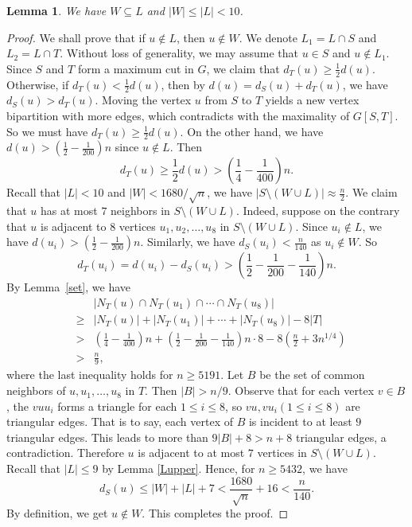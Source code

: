 \documentclass[11pt]{article}
\newtheorem{lemma}[theorem]{Lemma}
\begin{document}
  
  \begin{lemma} \label{lem-W-sub-L}
  We have $W \subseteq L$ and $|W| \le |L| < 10$. 
  \end{lemma}
  
  \begin{proof}
We shall prove that if $u\notin L$, then $u\notin W$. 
We denote $L_1=L\cap S$ and $L_2=L\cap T$. Without loss of generality, we may assume that $u\in S$ and 
   $u\notin L_1.$ Since  $S$ and $T$ form a maximum cut in $G$, 
   we claim that $d_T(u)\ge \frac{1}{2}d(u)$. 
   Otherwise, if $d_T(u)< \frac{1}{2}d(u)$, then 
   by $d(u)=d_S(u) + d_T(u)$, we have 
   $d_S(u) > d_T(u)$. Moving the vertex $u$ from 
   $S$ to $T$ yields a new vertex bipartition with more edges, 
   which contradicts with the maximality of $G[S,T]$. 
   So we must have $d_T(u)\ge \frac{1}{2}d(u)$. 
  On the other hand, 
  we have $d(u)> \left(\frac{1}{2}-\frac{1}{200} \right)n$ 
  since $u\not\in L$. Then 
   $$d_T(u)\ge \frac{1}{2}d(u)> 
   \left(\frac{1}{4}-\frac{1}{400} \right)n.$$
  Recall that 
  $|L|< 10$ and $|W| < 1680/ \sqrt{n}$, 
we have 
$  |S\setminus (W\cup L)| \approx \frac{n}{2}$. 
  We claim that $u$ has at most $7$ neighbors in 
  $S\setminus (W\cup L)$. 
  Indeed, suppose on the contrary that 
   $u$ is adjacent to $8$ vertices  $u_1, u_2,\ldots, u_8$ in $S\setminus (W\cup L)$.  Since $u_i\not\in L$,  we have $d(u_i)> \left(\frac{1}{2}-\frac{1}{200}\right )n$. Similarly, 
   we have $d_S(u_i)< \frac{n}{140}$ as $u_i\notin W$. So
  \[  d_T(u_i)=d(u_i)-d_S(u_i)> \left(\frac{1}{2}-\frac{1}{200} - \frac{1}{140} \right)n. \] 
   By Lemma~\ref{set}, we have
   \begin{eqnarray*}
&& \left|N_T(u)\cap N_T(u_1) \cap \cdots 
\cap N_T(u_8) \right|\\[2mm]
 &\ge&  |N_T(u)|+ |N_T(u_1)| + \cdots + |N_T(u_8)|  -8|T| \\
& > &\left (\frac{1}{4}-\frac{1}{400}\right)n+\left(\frac{1}{2}-\frac{1}{200} -\frac{1}{140} \right)n\cdot 8 - 8 \left( \frac{n}{2} + 3n^{1/4}\right)\\
 &>&\frac{n}{9}, 
\end{eqnarray*}
 where the last inequality holds for $n\ge 5191$.  
Let $B$ be the set of common neighbors of $u,u_1,\ldots ,u_8$ in $T$. 
Then $|B|>n/9$. 
Observe that for each vertex $v\in B$, the $vuu_i$ forms a triangle 
for each $1\le i\le 8$, so $vu,vu_i (1\le i \le 8)$ are triangular edges. That is to say, each vertex of $B$ 
is incident to at least $9$ triangular edges. 
This leads to more than $9|B| +8 > n +8$ triangular edges, a contradiction.
Therefore $u$ is adjacent to at most $7$ vertices in  $S\setminus (W\cup L)$. 
Recall that $|L|\le 9$ by Lemma \ref{Lupper}.  
Hence, for $n\ge 5432$, we have 
\[  d_S(u) \le |W|+|L|+ 7 
<  \frac{1680}{\sqrt{n}} + 16 < \frac{n}{140}. \] 
By definition, we get $u\notin W$.
This completes the proof. 
 \end{proof}
\end{document}
